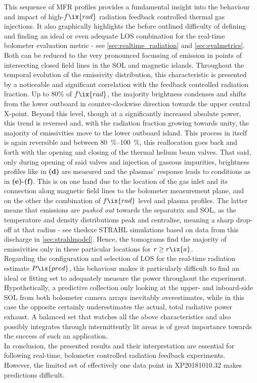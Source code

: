             This sequence of MFR profiles provides a fundamental insight into the behaviour and impact of high-$f\ix{rad}$ radiation feedback controlled thermal gas injections. It also graphically highlights the before outlined difficulty of defining and finding an ideal or even adequate LOS combination for the real-time bolometer evaluation metric - see \cref{sec:realtime_radiation} and \cref{sec:evalmetrics}. Both can be reduced to the very pronounced focussing of emission in points of intersecting closed field lines in the SOL and magnetic islands. Throughout the temporal evolution of the emissivity distribution, this characteristic is presented by a noticeable and significant correlation with the feedback controlled radiation fraction. Up to 80\% of $f\ix{rad}$, the majority brightness condenses and shifts from the lower outboard in counter-clockwise direction towards the upper central X-point. Beyond this level, though at a significantly increased absolute power, this trend is reversed and, with the radiation fraction growing towards unity, the majority of emissivities move to the lower outboard island. This process in itself is again reversible and between \SIrange{80}{100}{\percent}, this reallocation goes back and forth with the opening and closing of the thermal helium beam valves. That said, only during opening of said valves and injection of gaseous impurities, brightness profiles like in \textbf{(d)} are measured and the plasmas' response leads to conditions as in \textbf{(e)}-\textbf{(f)}. This is on one hand due to the location of the gas inlet and its connection along magnetic field lines to the bolometer measurement plane, and on the other the combination of $f\ix{rad}$ level and plasma profiles. The latter means that emissions are \textit{pushed out} towards the separatrix and SOL, as the temperature and density distributions peak and centralise, meaning a sharp drop-off at that radius - see thedsxe STRAHL simulations based on data from this discharge in \cref{sec:strahlmodel}. Hence, the tomograms find the majority of emissivities only in these particular locations for $r\ge r\ix{a}$.\\%
            Regarding the configuration and selection of LOS for the real-time radiation estimate $P\ix{pred}$, this behaviour makes it particularly difficult to find an ideal or fitting set to adequately measure the power throughout the experiment. Hypothetically, a predictive collection only looking at the upper- and inboard-side SOL from both bolometer camera arrays inevitably overestimates, while in this case the opposite certainly underestimates the actual, total radiative power exhaust. A balanced set that watches all the above characteristics and also possibly integrates through intermittently lit areas is of great importance towards the success of such an application.\\%
            In conclusion, the presented results and their interpretation are essential for following real-time, bolometer controlled radiation feedback experiments. However, the limited set of effectively one data point in XP20181010.32 makes predictions difficult.%
%
